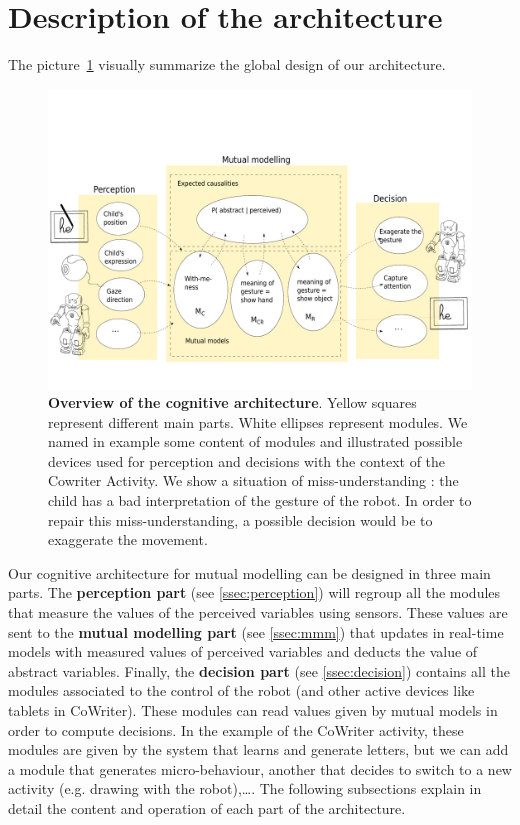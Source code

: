 \documentclass[conference]{IEEEtran}
\begin{document}
\section{Description of the architecture}
The picture~\ref{cog} visually summarize the global design of our architecture. 

\begin{figure}[!]
\centering
\includegraphics[width=1\columnwidth]{cognitive_archi}
\caption{\small\textbf{Overview of the cognitive architecture}. Yellow squares represent different main parts. White ellipses represent modules. We named in example some content of modules and illustrated possible devices used for perception and decisions with the context of the Cowriter Activity. We show a situation of miss-understanding : the child has a bad interpretation of the gesture of the robot. In order to repair this miss-understanding, a possible decision would be to exaggerate the movement. }
\label{cog}
\end{figure}
Our cognitive architecture for mutual modelling can be designed in three main parts. 
The \textbf{perception part} (see \ref{ssec:perception}) will regroup all the modules that measure the values of the perceived variables using sensors. 
These values are sent to the \textbf{mutual modelling part} (see \ref{ssec:mmm}) that updates in real-time models with measured values of perceived variables and deducts the value of abstract variables. Finally, the \textbf{decision part} (see \ref{ssec:decision}) contains all the modules associated to the control of the robot (and other active devices like tablets in CoWriter). These modules can read values given by mutual models in order to compute decisions. In the example of the CoWriter activity, these modules are given by the system that learns and generate letters, but we can add a module that generates micro-behaviour, another that decides to switch to a new activity (e.g. drawing with the robot),\dots. The following subsections explain in detail the content and operation of each part of the architecture. 
\end{document}
